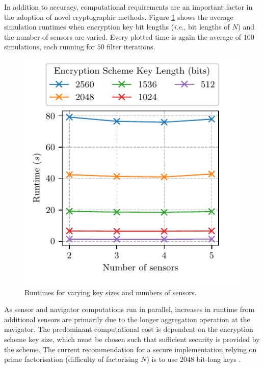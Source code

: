 \documentclass[10pt,letterpaper,oneside,twocolumn,journal]{IEEEtran}
\theoremstyle{definition}
\theoremstyle{definition}
\theoremstyle{remark}
\begin{document}
In addition to accuracy, computational requirements are an important factor in the adoption of novel cryptographic methods. Figure \ref{fig:sim_timing} shows the average simulation runtimes when encryption key bit lengths (\textit{i.e.}, bit lengths of $N$) and the number of sensors are varied. Every plotted time is again the average of $100$ simulations, each running for $50$ filter iterations. 
\begin{figure}[htbp]
\centering
\includegraphics{images/timing.pdf}
\caption{Runtimes for varying key sizes and numbers of sensors.}
\label{fig:sim_timing}
\end{figure}
As sensor and navigator computations run in parallel, increases in runtime from additional sensors are primarily due to the longer aggregation operation at the navigator. The predominant computational cost is dependent on the encryption scheme key size, which must be chosen such that sufficient security is provided by the scheme. The current recommendation for a secure implementation relying on prime factorisation (difficulty of factorising $N$) is to use $2048$ bit-long keys \cite{barkerRecommendationPairwiseKey2019}.

% 
%                                               
%                                               
%                                               
% 
\end{document}

